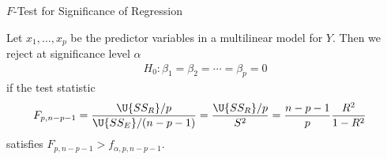 \begin{frame}{$F$-Test for Significance of Regression}

\justifying
{} Let $x_1, \ldots, x_p$ be the predictor variables in a multilinear model for $Y$. Then we reject at significance level $\alpha$
\begin{align*}
H_0: \beta_1 = \beta_2 = \cdots = \beta_p = 0
\end{align*}
if the test statistic
\begin{align*}
F_{p,n-p-1} & = \frac{\U{SS_R}/p}{\U{SS_E}/(n-p-1)} = \frac{\U{SS_R}/p}{S^2} = \frac{n-p-1}{p}\frac{R^2}{1-R^2}
\end{align*}
satisfies $F_{p,n-p-1} > f_{\alpha,p,n-p-1}$.

\end{frame}
